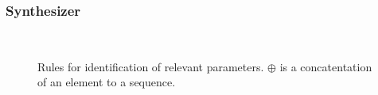 \documentclass{beamer}
\begin{document}
\begin{frame}
\frametitle{Synthesizer}
\begin{figure}[ht!]
     
       \begin{center}
%
       
        \\ %
        
%
    \end{center}
       
    \caption{%
        Rules for identification of relevant parameters. $\oplus$ is a concatentation of an element to a sequence.
     }%
   \label{fig:subfigures}
\end{figure}
\end{frame}
\end{document}

